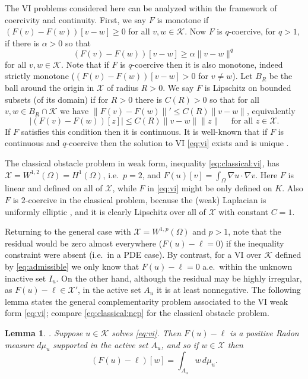 \documentclass[]{interact}
\theoremstyle{plain}%
\newtheorem{lemma}[theorem]{Lemma}
\theoremstyle{definition}
\theoremstyle{remark}
\newcommand{\grad}{\nabla}
\newcommand{\cK}{\mathcal{K}}
\newcommand{\cX}{\mathcal{X}}
\begin{document}
The VI problems considered here can be analyzed within the framework of coercivity and continuity.  First, we say $F$ is monotone if $(F(v) - F(w))[v - w] \ge 0$ for all $v,w \in \cK$.  Now $F$ is $q$-coercive, for $q>1$, if there is $\alpha>0$ so that
\begin{equation} \label{eq:coercive}
(F(v) - F(w))[v - w] \ge \alpha \|v-w\|^q
\end{equation}
for all $v,w \in \cK$.  Note that if $F$ is $q$-coercive then it is also monotone, indeed strictly monotone ($(F(v) - F(w))[v - w] > 0$ for $v\ne w$).  Let $B_R$ be the ball around the origin in $\cX$ of radius $R>0$.  We say $F$ is Lipschitz on bounded subsets (of its domain) if for $R>0$ there is $C(R)>0$ so that for all $v,w \in B_R\cap \cK$ we have $\|F(v)-F(w)\|' \le C(R) \|v-w\|$, equivalently
\begin{equation} \label{eq:lipschitz}
\left|(F(v)-F(w))[z]\right| \le C(R) \|v-w\| \|z\| \quad \text{ for all } z \in \cX.
\end{equation}
If $F$ satisfies this condition then it is continuous.  It is well-known that if $F$ is continuous and $q$-coercive then the solution to VI \eqref{eq:vi} exists and is unique \cite[Corollary III.1.8]{KinderlehrerStampacchia1980}.

The classical obstacle problem in weak form, inequality \eqref{eq:classical:vi}, has $\cX=W^{1,2}(\Omega) = H^1(\Omega)$, i.e.~$p=2$, and $F(u)[v] = \int_\Omega \grad u \cdot \grad v$.  Here $F$ is linear and defined on all of $\cX$, while $F$ in \eqref{eq:vi} might be only defined on $K$.  Also $F$ is $2$-coercive in the classical problem, because the (weak) Laplacian is uniformly elliptic \cite{Evans2010}, and it is clearly Lipschitz over all of $\cX$ with constant $C=1$.

Returning to the general case with $\cX = W^{1,p}(\Omega)$ and $p>1$, note that the residual would be zero almost everywhere ($F(u)-\ell=0$) if the inequality constraint were absent (i.e.~in a PDE case).  By contrast, for a VI over $\cK$ defined by \eqref{eq:admissible} we only know that $F(u)-\ell=0$ a.e.~within the unknown inactive set $I_u$.  On the other hand, although the residual may be highly irregular, as $F(u)-\ell\in \cX'$, in the active set $A_u$ it is at least nonnegative.  The following lemma states the general complementarity problem associated to the VI weak form \eqref{eq:vi}; compare \eqref{eq:classical:ncp} for the classical obstacle problem.

\begin{lemma} \cite[Theorem II.6.9]{KinderlehrerStampacchia1980}.  Suppose $u\in \cK$ solves \eqref{eq:vi}.  Then $F(u)-\ell$ is a positive Radon measure $d\mu_u$ supported in the active set $A_u$, and so if $w\in\cX$ then
\begin{equation}
(F(u)-\ell)[w] = \int_{A_u} w\, d\mu_u. \label{eq:measure}
\end{equation}
\end{lemma}
\end{document}
